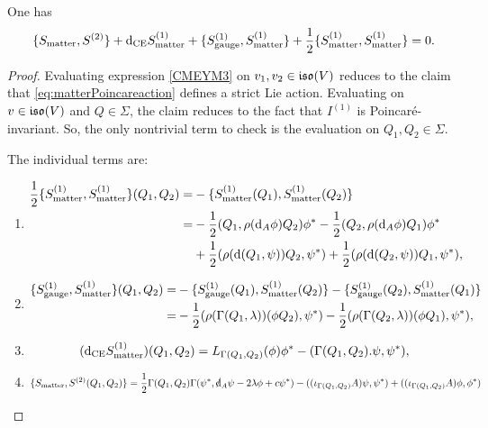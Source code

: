 \documentclass[10pt, oneside]{article}
\begin{document}
\begin{lemma} 
One has
\begin{equation}\label{CMEYM3}
\{S_{\mathrm{matter}}, S^{(2)}\} + {\rm d}_{\mathrm{CE}} S_{\mathrm{matter}}^{(1)} + \{S_{\mathrm{gauge}}^{(1)}, S_{\mathrm{matter}}^{(1)}\} + \frac{1}{2} \{S_{\mathrm{matter}}^{(1)}, S_{\mathrm{matter}}^{(1)}\} = 0 .
\end{equation}
\end{lemma}
\begin{proof}
Evaluating expression \eqref{CMEYM3} on $v_1,v_2 \in \mathfrak{iso}(V)$ reduces to the claim that \eqref{eq:matterPoincareaction} defines a strict Lie action. Evaluating on $v \in \mathfrak{iso}(V)$ and $Q \in \Sigma$, the claim reduces to the fact that $I^{(1)}$ is Poincar\'{e}-invariant. So, the only nontrivial term to check is the evaluation on $Q_1,Q_2 \in \Sigma$. 

The individual terms are:
\begin{enumerate}
\item \begin{align*}
\frac{1}{2}\{S_{\mathrm{matter}}^{(1)}, S_{\mathrm{matter}}^{(1)}\}(Q_1, Q_2) =& -\{S_{\mathrm{matter}}^{(1)}(Q_1), S_{\mathrm{matter}}^{(1)}(Q_2)\} \\
=&-\frac{1}{2}(Q_1, \rho({\rm d}_A \phi) Q_2)\phi^* - \frac{1}{2}(Q_2, \rho({\rm d}_A \phi)Q_1)\phi^* \\ &  +\frac{1}{2}(\rho({\rm d}(Q_1,\psi))Q_2, \psi^*) +\frac{1}{2} (\rho({\rm d}(Q_2, \psi)) Q_1, \psi^*),
\end{align*}

\item \begin{align*}
\{S_{\mathrm{gauge}}^{(1)}, S_{\mathrm{matter}}^{(1)}\}(Q_1, Q_2) = &-\{S_{\mathrm{gauge}}^{(1)}(Q_1), S_{\mathrm{matter}}^{(1)}(Q_2)\} - \{S_{\mathrm{gauge}}^{(1)}(Q_2), S_{\mathrm{matter}}^{(1)}(Q_1)\} \\
=& -\frac{1}{2}(\rho(\Gamma(Q_1, \lambda))(\phi Q_2), \psi^*) - \frac{1}{2}(\rho(\Gamma(Q_2, \lambda))(\phi Q_1), \psi^*),
\end{align*}

\item
\[
({\rm d}_{\mathrm{CE}}S_{\mathrm{matter}}^{(1)})(Q_1,Q_2) = L_{\Gamma(Q_1,Q_2)} (\phi)\phi^* - (\Gamma(Q_1,Q_2).\psi, \psi^*),
\]

\item
\[
\{S_{\matter}, S^{(2)}(Q_1,Q_2)\} =  \frac{1}{2} \Gamma(Q_1,Q_2) \Gamma(\psi^*, \sd \d_A \psi - 2 \lambda\phi + c\psi^*) - ((\iota_{\Gamma(Q_1, Q_2)} A)\psi, \psi^*) + ((\iota_{\Gamma(Q_1, Q_2)} A)\phi, \phi^*)
\]
\end{enumerate}


\end{proof}
\end{document}
